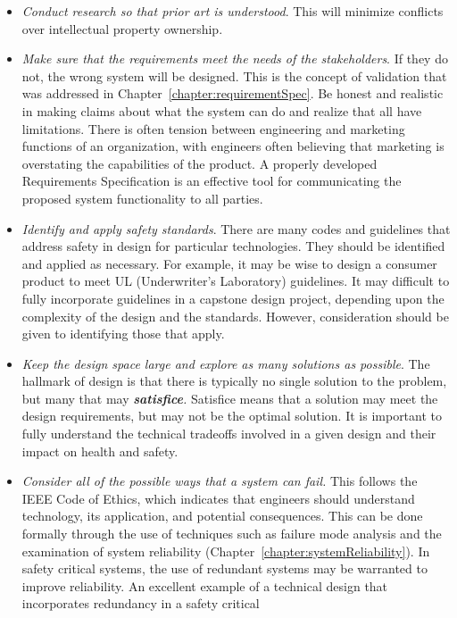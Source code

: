 \begin{itemize}
\item
  \emph{Conduct research so that prior art is understood}. This will
  minimize conflicts over intellectual property ownership.
\item
  \emph{Make sure that the requirements meet the needs of the
  stakeholders}. If they do not, the wrong system will be designed. This
  is the concept of validation that was addressed in 
Chapter~\ref{chapter:requirementSpec}. Be
  honest and realistic in making claims about what the system can do and
  realize that all have limitations. There is often tension between
  engineering and marketing functions of an organization, with engineers
  often believing that marketing is overstating the capabilities of the
  product. A properly developed Requirements Specification is an
  effective tool for communicating the proposed system functionality to
  all parties.
\item
  \emph{Identify and apply safety standards}. There are many codes and
  guidelines that address safety in design for particular technologies.
  They should be identified and applied as necessary. For example, it
  may be wise to design a consumer product to meet UL (Underwriter's
  Laboratory) guidelines. It may difficult to fully incorporate
  guidelines in a capstone design project, depending upon the complexity
  of the design and the standards. However, consideration should be
  given to identifying those that apply.
\item
  \emph{Keep the design space large and explore as many solutions as
  possible}. The hallmark of design is that there is typically no single
  solution to the problem, but many that may \emph{\textbf{satisfice}.}
  Satisfice means that a solution may meet the design requirements, but
  may not be the optimal solution. It is important to fully understand
  the technical tradeoffs involved in a given design and their impact on
  health and safety.
\item
  \emph{Consider all of the possible ways that a system can fail.} This
  follows the IEEE Code of Ethics, which indicates that engineers should
  understand technology, its application, and potential consequences.
  This can be done formally through the use of techniques such as
  failure mode analysis and the examination of system reliability
  (Chapter~\ref{chapter:systemReliability}). In safety critical systems, 
the use of redundant systems
  may be warranted to improve reliability. An excellent example of a
  technical design that incorporates redundancy in a safety critical

\end{itemize}
